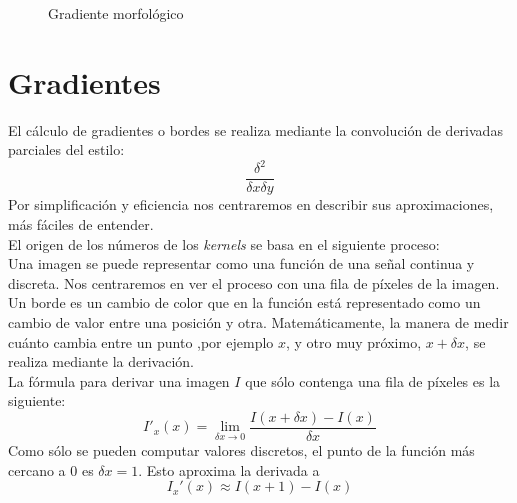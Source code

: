 \begin{figure}[H]
  \centering \setlength\fboxsep{0pt} \setlength\fboxrule{0.5pt}
  \caption{Gradiente morfológico}
\end{figure}

\section{Gradientes}
El cálculo de gradientes o bordes \emph{\citep*[11. Feature
  Detectors]{fisher1996hypermedia}} \emph{\citep*[Gradients and Sobel
  Derivatives]{opencv_book-bib}} \emph{\citep*[5.1 Edge
  Tracking]{toennies2012guide}} se realiza mediante la convolución de
derivadas parciales del estilo:
\begin{equation*}
  \frac{\delta^{2}}{\delta x \delta y}
\end{equation*}
Por simplificación y eficiencia nos centraremos en describir sus
aproximaciones, más fáciles de entender. \\
El origen de los números de los \emph{kernels} se basa en el siguiente
proceso:\\
Una imagen se puede representar como una función de una señal continua
y discreta. Nos centraremos en ver el proceso con una fila de píxeles
de la imagen. Un borde es un cambio de color que en la función está
representado como un cambio de valor entre una posición y
otra. Matemáticamente, la manera de medir cuánto cambia entre un punto
,por ejemplo $x$, y otro muy próximo, $x + \delta x$, se realiza
mediante la
derivación.\\
La fórmula para derivar una imagen $I$ que sólo contenga una fila de
píxeles es la siguiente:
\begin{equation*}
  I'_x(x) = \lim_{\delta x \to 0}\frac{I(x+\delta x) - I(x)}{\delta x}
\end{equation*}
Como sólo se pueden computar valores discretos, el punto de la función
más cercano a $0$ es $\delta x = 1$. Esto aproxima la derivada a
\begin{equation*}
  I_x'(x) \approx I(x + 1) - I(x)
\end{equation*}
